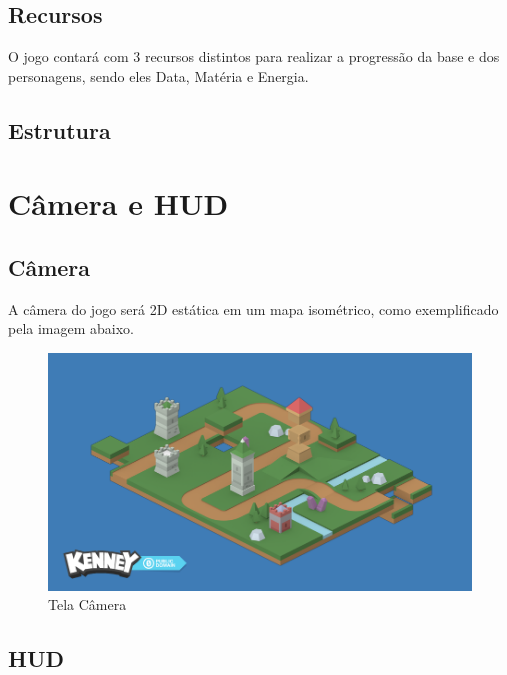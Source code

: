 \documentclass[11pt]{article} %
\begin{document}
\subsection{Recursos}

O jogo contará com 3 recursos distintos para realizar a progressão da base e dos personagens, sendo eles Data, Matéria e Energia.

\subsection{Estrutura}

\newpage

\section{Câmera e HUD}

\subsection{Câmera}

A câmera do jogo será 2D estática em um mapa isométrico, como exemplificado pela imagem abaixo.
\begin{figure}[!htp]
\centering
\includegraphics[scale=0.25]{res/map_example.png}
\caption{Tela Câmera}
\label{Tela Barracks}
\end{figure}

\subsection{HUD}
\end{document}
